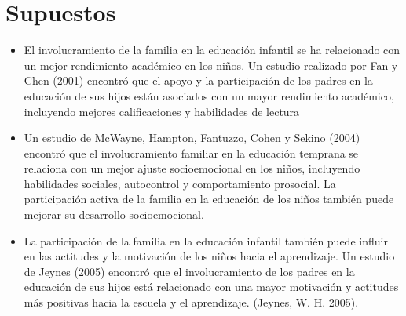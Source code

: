 \section{Supuestos}
\begin{itemize}
	\item El involucramiento de la familia en la educación infantil se ha relacionado con un mejor rendimiento académico en los niños. Un estudio realizado por Fan y Chen (2001) encontró que el apoyo y la participación de los padres en la educación de sus hijos están asociados con un mayor rendimiento académico, incluyendo mejores calificaciones y habilidades de lectura
	\item Un estudio de McWayne, Hampton, Fantuzzo, Cohen y Sekino (2004) encontró que el involucramiento familiar en la educación temprana se relaciona con un mejor ajuste socioemocional en los niños, incluyendo habilidades sociales, autocontrol y comportamiento prosocial.
	La participación activa de la familia en la educación de los niños también puede mejorar su desarrollo socioemocional.
	\item La participación de la familia en la educación infantil también puede influir en las actitudes y la motivación de los niños hacia el aprendizaje. Un estudio de Jeynes (2005) encontró que el involucramiento de los padres en la educación de sus hijos está relacionado con una mayor motivación y actitudes más positivas hacia la escuela y el aprendizaje. (Jeynes, W. H. 2005).
\end{itemize}